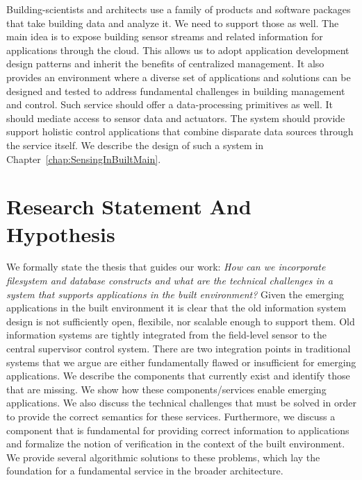 Building-scientists and architects use a family of products and software packages that take building data 
and analyze it.  We need to support those as well.  The main idea is to expose building sensor streams and related information for 
applications through the cloud.  This allows us to adopt application development design patterns and inherit the benefits of 
centralized management.   It also provides an environment where a diverse set of applications and solutions can be designed
and tested to address fundamental challenges in building management and control.  %
Such service should offer a data-processing primitives as well.   It should mediate access to sensor data and actuators.
The system should provide support holistic control applications that combine disparate data sources through the service itself.
We describe the design of such a system in Chapter~\ref{chap:SensingInBuiltMain}.


\section{Research Statement And Hypothesis}
We formally state the thesis that guides our work: %
\emph{How can we incorporate filesystem and database constructs and what are the technical challenges in a system that supports applications
in the built environment?}
Given the emerging applications in
the built environment it is clear that the old information system design is not sufficiently open, flexibile, nor
scalable enough to support them.  Old information systems are tightly integrated from the field-level sensor to
the central supervisor control system.  There are two integration points in traditional systems that we argue 
are either fundamentally flawed or insufficient for emerging applications.  We describe the components that 
currently exist and identify those that are missing.  We show how these components/services enable emerging applications.  We also
discuss the technical challenges that must be solved in order to provide the correct semantics for these services.
Furthermore, we discuss a component that is fundamental for providing correct information to applications 
and formalize the notion of verification in the context of the built environment.  We provide several algorithmic 
solutions to these problems, which lay the foundation for a fundamental service in the broader architecture.


